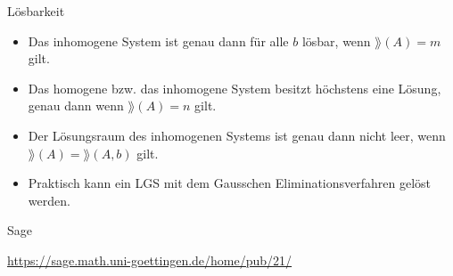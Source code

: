 \documentclass[hyperref={xetex}]{beamer}
\begin{document}
\begin{frame}{Lösbarkeit}
\begin{itemize}
\item Das inhomogene System ist genau dann für alle $b$
lösbar, wenn $\rang(A)=m$ gilt.
\item Das homogene bzw. das inhomogene System besitzt höchstens eine
Lösung, genau dann wenn $\rang(A)=n$ gilt.
\item Der Lösungsraum des inhomogenen Systems ist genau dann nicht
leer, wenn $\rang(A)=\rang(A, b)$ gilt. %
\item Praktisch kann ein LGS mit dem {\color{red} Gausschen
Eliminationsverfahren} gelöst werden.
\end{itemize}
\end{frame}



\begin{frame}{Sage}
    \begin{center}
        \url{https://sage.math.uni-goettingen.de/home/pub/21/}
    \end{center}
\end{frame}
\end{document}
